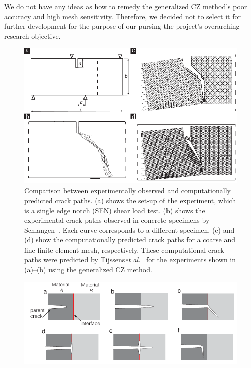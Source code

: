 \documentclass[12pt,onecolumn]{article}
\begin{document}
We do not have any ideas as how to remedy the generalized CZ method's poor accuracy and high mesh sensitivity. Therefore, we decided not to select it for further development for the purpose of our pursing the project's overarching research objective.




\begin{figure}
    \centering
    \includegraphics[width=1.0\textwidth]{./Figures/CZM/CZM_crack_path_ver2.pdf}
    \caption{
Comparison between experimentally observed and computationally predicted crack paths.
    (a) shows the set-up of the experiment, which is a single edge notch (SEN) shear load test.   (b) shows the experimental crack paths observed in concrete specimens by   Schlangen~\cite{schlangen1993experimental}. Each curve corresponds to a different specimen. (c) and (d) show the computationally predicted crack paths  for a coarse and fine finite  element mesh, respectively. These computational crack paths  were predicted by  Tijssens\textit{et al.}~\cite{tijssens2000numerical} for the experiments  shown in (a)--(b) using the generalized CZ method.}
    \label{Fig:CZM}
\end{figure}






\begin{figure}
    \centering
    \includegraphics[width=1.0\textwidth]{./Figures/XFEM/CrackPathTopology.pdf}
    \caption{}
    \label{Fig:TopologyChanges}
\end{figure}
\end{document}
